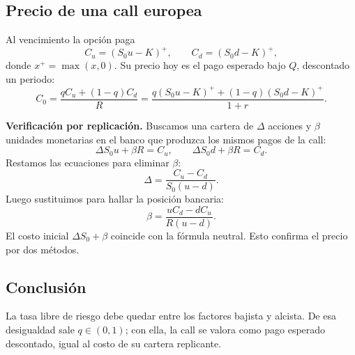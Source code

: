 \documentclass[11pt, a4paper]{article}
\begin{document}
\subsection*{Precio de una call europea}
Al vencimiento la opción paga
\[
C_u=(S_0u-K)^+,\qquad C_d=(S_0d-K)^+,
\]
donde \(x^+=\max(x,0)\). Su precio hoy es el pago esperado bajo \(Q\), descontado un periodo:
\[
\boxed{C_0=\frac{qC_u+(1-q)C_d}{R}
=\frac{q(S_0u-K)^++(1-q)(S_0d-K)^+}{1+r}}.
\]

\textbf{Verificación por replicación.} Buscamos una cartera de \(\Delta\) acciones y \(\beta\) unidades monetarias en el banco que produzca los mismos pagos de la call:
\[
\Delta S_0u+\beta R=C_u,\qquad
\Delta S_0d+\beta R=C_d.
\]
Restamos las ecuaciones para eliminar \(\beta\):
\[
\Delta=\frac{C_u-C_d}{S_0(u-d)}.
\]
Luego sustituimos para hallar la posición bancaria:
\[
\beta=\frac{uC_d-dC_u}{R(u-d)}.
\]
El costo inicial \(\Delta S_0+\beta\) coincide con la fórmula neutral. Esto confirma el precio por dos métodos.

\subsection*{Conclusión}
La tasa libre de riesgo debe quedar entre los factores bajista y alcista. De esa desigualdad sale \(q\in(0,1)\); con ella, la call se valora como pago esperado descontado, igual al costo de su cartera replicante.
\end{document}
